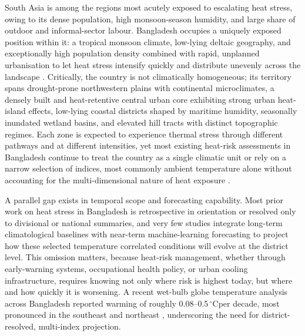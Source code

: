 \documentclass[pdflatex,sn-basic,lineno]{sn-jnl}
\newcommand{\degC}{\ensuremath{^{\circ}\mathrm{C}}}
\begin{document}
South Asia is among the regions most acutely exposed to escalating heat stress,
owing to its dense population, high monsoon-season humidity, and large share of
outdoor and informal-sector labour. Bangladesh occupies a uniquely exposed
position within it: a tropical monsoon climate, low-lying deltaic geography, and
exceptionally high population density combined with rapid, unplanned urbanisation
to let heat stress intensify quickly and distribute unevenly across the landscape
\citep{dewan2021}. Critically, the country is not climatically homogeneous; its
territory spans drought-prone northwestern plains with continental microclimates,
a densely built and heat-retentive central urban core exhibiting strong urban
heat-island effects, low-lying coastal districts shaped by maritime humidity,
seasonally inundated wetland basins, and elevated hill tracts with distinct
topographic regimes. Each zone is expected to experience thermal stress through
different pathways and at different intensities, yet most existing heat-risk
assessments in Bangladesh continue to treat the country as a single climatic unit
or rely on a narrow selection of indices, most commonly ambient temperature
alone without accounting for the multi-dimensional nature of heat exposure
\citep{Abrar2022}.

A parallel gap exists in temporal scope and forecasting capability. Most prior
work on heat stress in Bangladesh is retrospective in orientation or resolved only
to divisional or national summaries, and very few studies integrate long-term
climatological baselines with near-term machine-learning forecasting to project
how these selected temperature correlated conditions will evolve at the district level. This omission matters,
because heat-risk management, whether through early-warning systems, occupational
health policy, or urban cooling infrastructure, requires knowing not only where
risk is highest today, but where and how quickly it is worsening. A recent
wet-bulb globe temperature analysis across Bangladesh reported warming of roughly
0.08--0.5\,\degC per decade, most pronounced in the southeast and northeast
\citep{kamal2024scientific}, underscoring the need for district-resolved, multi-index projection.
\end{document}
